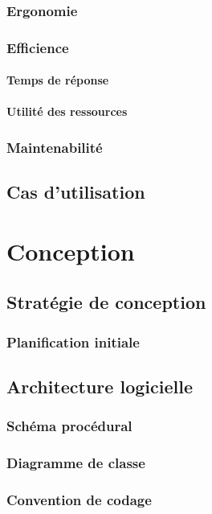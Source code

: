 \documentclass[a4paper,10pt,openany,oneside]{report}
\begin{document}
\subsection{Ergonomie}
\subsection{Efficience}
\subsubsection{Temps de réponse}
\subsubsection{Utilité des ressources}
\subsection{Maintenabilité}
\section{Cas d'utilisation}


\chapter{Conception}
\thispagestyle{headings}
\section{Stratégie de conception}
\subsection{Planification initiale}

\section{Architecture logicielle}
\subsection{Schéma procédural}
\subsection{Diagramme de classe}
\subsection{Convention de codage}
\end{document}

